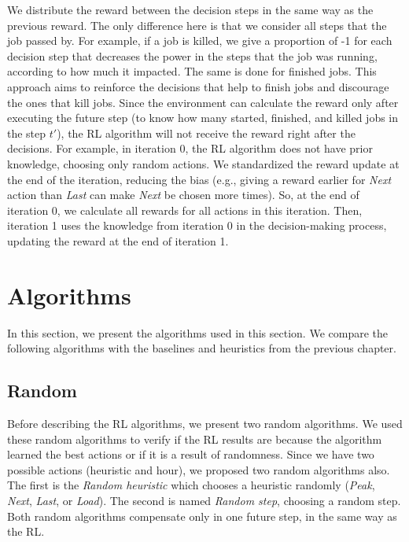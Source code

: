 We distribute the reward between the decision steps in the same way as the previous reward. The only difference here is that we consider all steps that the job passed by. For example, if a job is killed, we give a proportion of -1 for each decision step that decreases the power in the steps that the job was running, according to how much it impacted. The same is done for finished jobs. This approach aims to reinforce the decisions that help to finish jobs and discourage the ones that kill jobs. 
Since the environment can calculate the reward only after executing the future step (to know how many started, finished, and killed jobs in the step $t'$), the RL algorithm will not receive the reward right after the decisions. For example, in iteration 0, the RL algorithm does not have prior knowledge, choosing only random actions. We standardized the reward update at the end of the iteration, reducing the bias (e.g., giving a reward earlier for \emph{Next} action than \emph{Last} can make \emph{Next} be chosen more times). So, at the end of iteration 0, we calculate all rewards for all actions in this iteration. Then, iteration 1 uses the knowledge from iteration 0 in the decision-making process, updating the reward at the end of iteration 1.

\section{Algorithms}
\label{sec:RL_algos}
In this section, we present the algorithms used in this section. We compare the following algorithms with the baselines and heuristics from the previous chapter.

\subsection{Random}
Before describing the RL algorithms, we present two random algorithms. We used these random algorithms to verify if the RL results are because the algorithm learned the best actions or if it is a result of randomness. Since we have two possible actions (heuristic and hour), we proposed two random algorithms also. The first is the \emph{Random heuristic} which chooses a heuristic randomly (\emph{Peak}, \emph{Next}, \emph{Last}, or \emph{Load}). The second is named \emph{Random step}, choosing a random step. Both random algorithms compensate only in one future step, in the same way as the RL.

